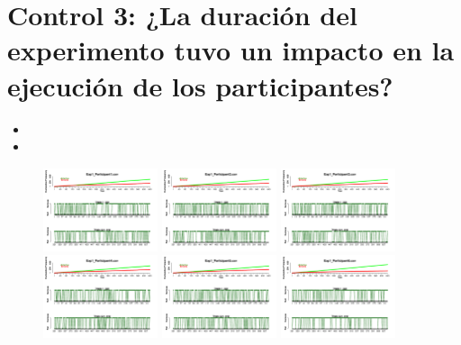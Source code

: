 















\section{Control 3: ¿La duración del experimento tuvo un impacto en la ejecución de los participantes?}

\begin{itemize}
\item
\item
\end{itemize}

\begin{figure}[th]
\centering
\includegraphics[width=0.30\textwidth]{Figures/Success_Exp1_P1} \includegraphics[width=0.30\textwidth]{Figures/Success_Exp1_P2} \includegraphics[width=0.30\textwidth]{Figures/Success_Exp1_P3}
\includegraphics[width=0.30\textwidth]{Figures/Success_Exp1_P4} \includegraphics[width=0.30\textwidth]{Figures/Success_Exp1_P5} \includegraphics[width=0.30\textwidth]{Figures/Success_Exp1_P6}

\end{figure}
